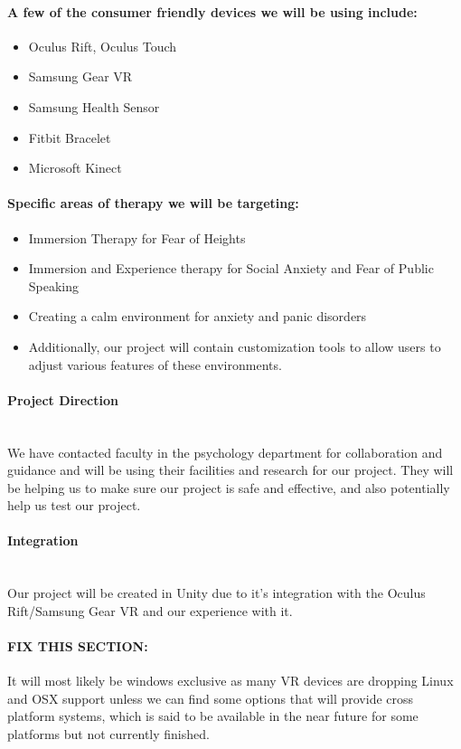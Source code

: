 \documentclass[a4paper,10pt]{article}
\begin{document}
	\paragraph{A few of the consumer friendly devices we will be using include:}
	\begin{itemize}
		\item Oculus Rift, Oculus Touch
		\item Samsung Gear VR
		\item Samsung Health Sensor
		\item Fitbit Bracelet
		\item Microsoft Kinect
	\end{itemize}
	
	\paragraph{Specific areas of therapy we will be targeting:}
	\begin{itemize}
		\item Immersion Therapy for Fear of Heights
		\item Immersion and Experience therapy for Social Anxiety and Fear of Public Speaking
		\item Creating a calm environment for anxiety and panic disorders
		\item Additionally, our project will contain customization tools to allow users to adjust various features of these environments.
	\end{itemize}
	
	
	\paragraph{Project Direction} ~\\ We have contacted faculty in the psychology department for collaboration and guidance and will be using their facilities and research for our project.  They will be helping us to make sure our project is safe and effective, and also potentially help us test our project.
	\paragraph{Integration} ~\\ Our project will be created in Unity due to it's integration with the Oculus Rift/Samsung Gear VR and our experience with it.
	\paragraph{ FIX THIS SECTION:}It will most likely be windows exclusive as many VR devices are dropping Linux and OSX support unless we can find some options that will provide cross platform systems, which is said to be available in the near future for some platforms but not currently finished.  
	
\end{document}

